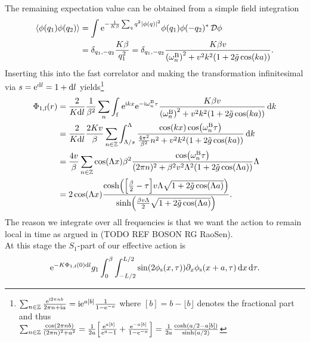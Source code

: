 \documentclass[english, parskip=full]{scrartcl}
\begin{document}
The remaining expectation value can be obtained from a simple field integration
\begin{align}
\bra*{\phi(q_1)\phi(q_2)} &= \int \powe{-\frac{1}{K\beta} \sum_q q^2 \abs*{\phi(q)}^2} \phi(q_1)\phi(-q_2)^\ast\,\mathcal{D}\phi \\
&= \delta_{q_1,-q_2} \frac{K\beta}{q_1^2} = \delta_{q_1,-q_2} \frac{K\beta v}{\kla*{\omega_n^\B}^2 + v^2k^2 \kla*{1 + 2\tilde{g}\cos(ka)}}.
\end{align}
Inserting this into the fast correlator and making the transformation infinitesimal via $s=\text{e}^{\text{d} l} = 1 + \text{d} l$ yields\footnote{$\sum_{n\in\mathbb{Z}} \frac{\text{e}^{\text{i} 2\pi nb}}{2\pi n + \text{i} a} = \text{i} \text{e}^{a [b]} \frac{1}{1 - \text{e}^{-a}}$ where $[b] = b - \lfloor b \rfloor$ denotes the fractional part and thus\\
$\sum_{n\in\mathbb{Z}} \frac{\cos(2\pi nb)}{(2\pi n)^2 + a^2} = \frac{1}{2a} \klb*{\frac{\powe{a[b]}}{\powe{a} - 1} + \frac{\powe{-a[b]}}{1 - \powe{-a}}} = \frac{1}{2a} \frac{\cosh\kla*{a/2 - a[b]}}{\sinh(a/2)}$}
\begin{align}
\Phi_{1,\f}(r) &= \frac{2}{K\d l} \frac{1}{\beta^2} \sum_{n} \intx{\f}{ }{ \powe{\i kx} \powe{-\i\omega_n^\B\tau} \frac{K\beta v}{\kla*{\omega_n^\B}^2 + v^2k^2\kla*{1 + 2\tilde{g}\cos(ka)}}}{k} \\
&= \frac{2}{K\d l} \frac{2Kv}{\beta} \sum_{n\in\mathbb{Z}} \intx{\Lambda/s}{\Lambda}{\frac{\cos(kx) \cos\kla*{\omega_n^\B\tau}}{\frac{4\pi^2}{\beta^2}n^2 + v^2k^2\kla*{1 + 2\tilde{g}\cos(ka)}}}{k}\\
&= \frac{4v}{\beta} \sum_{n\in\mathbb{Z}} \cos(\Lambda x) \beta^2 \frac{\cos\kla*{\omega_n^\B\tau}}{(2\pi n)^2 + \beta^2 v^2\Lambda^2\kla*{1 + 2\tilde{g}\cos(\Lambda a)}} \Lambda \\
&= 2 \cos(\Lambda x) \frac{\cosh\kla*{\klb*{\frac{\beta}{2} - \tau} v\Lambda \sqrt{1 + 2\tilde{g}\cos(\Lambda a)}}}{\sinh\kla*{\frac{\beta v\Lambda}{2} \sqrt{1 + 2\tilde{g}\cos(\Lambda a)}}}.
\end{align}
The reason we integrate over all frequencies is that we want the action to remain local in time as argued in (TODO REF BOSON RG RaoSen).\\
At this stage the $S_1$-part of our effective action is
\begin{align}
\powe{-K\Phi_{1,\f}(0) \d l} g_1 \intx{0}{\beta}{\intx{-L/2}{L/2}{ \sin\kla*{2\phi_\s(x,\tau)} \partial_x\phi_\s(x+a,\tau) }{x}}{\tau}.
\end{align}
\end{document}
